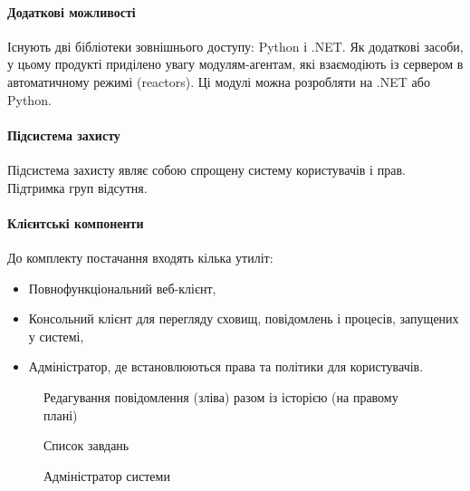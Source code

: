 \documentclass{memoir}
\begin{document}
\paragraph{Додаткові можливості}

Існують дві бібліотеки зовнішнього доступу: Python і .NET. Як додаткові засоби, у цьому продукті приділено увагу модулям-агентам, які взаємодіють із сервером в автоматичному режимі (reactors). Ці модулі можна розробляти на .NET або Python.

\paragraph{Підсистема захисту}

Підсистема захисту являє собою спрощену систему користувачів і прав. Підтримка груп відсутня.

\paragraph{Клієнтські компоненти}

До комплекту постачання входять кілька утиліт:

\begin{itemize}
    \item Повнофункціональний веб-клієнт,
    \item Консольний клієнт для перегляду сховищ, повідомлень і процесів, запущених у системі,
    \item Адміністратор, де встановлюються права та політики для користувачів.
\end{itemize}

\begin{figure}[h]
    \centering
    \caption{Редагування повідомлення (зліва) разом із історією (на правому плані)}
    \label{fig:openwfe_message_edit}
\end{figure}

\begin{figure}[h]
    \centering
    \caption{Список завдань}
    \label{fig:openwfe_task_list}
\end{figure}

\begin{figure}[h]
    \centering
    \caption{Адміністратор системи}
    \label{fig:openwfe_admin}
\end{figure}
\end{document}
